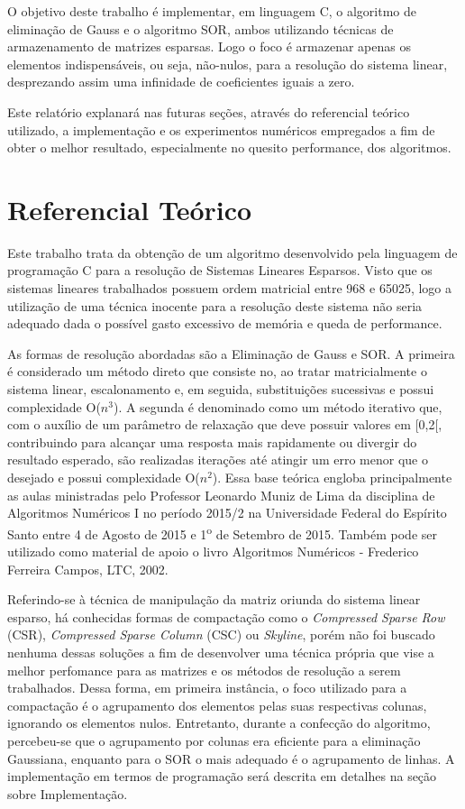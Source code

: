 \documentclass[
	article,			%
	11pt,				%
	oneside,			%
	a4paper,			%
	english,			%
	brazil,				%
	sumario=tradicional
	]{abntex2}
\begin{document}
O objetivo deste trabalho é implementar, em linguagem C, o algoritmo de eliminação de Gauss e o algoritmo SOR, ambos utilizando técnicas de armazenamento de matrizes esparsas. Logo o foco é armazenar apenas os elementos indispensáveis, ou seja, não-nulos, para a resolução do sistema linear, desprezando assim uma infinidade de coeficientes iguais a zero.

Este relatório explanará nas futuras seções, através do referencial teórico utilizado, a implementação e os experimentos numéricos empregados a fim de obter o melhor resultado, especialmente no quesito performance, dos algoritmos. 


\section{Referencial Teórico}

Este trabalho trata da obtenção de um algoritmo desenvolvido pela linguagem de programação C para a resolução de Sistemas Lineares Esparsos. Visto que os sistemas lineares trabalhados possuem ordem matricial entre 968 e 65025, logo a utilização de uma técnica inocente para a resolução deste sistema não seria adequado dada o possível gasto excessivo de memória e queda de performance. 

As formas de resolução abordadas são a Eliminação de Gauss e SOR. A primeira é considerado um método direto que consiste no, ao tratar matricialmente o sistema linear, escalonamento e, em seguida, substituições sucessivas e possui complexidade O($n^3$). A segunda é denominado como um método iterativo que, com o auxílio de um parâmetro de relaxação que deve possuir valores em [0,2[, contribuindo para alcançar uma resposta mais rapidamente ou divergir do resultado esperado, são realizadas iterações até atingir um erro menor que o desejado e possui complexidade O($n^2$). Essa base teórica engloba principalmente as aulas ministradas pelo Professor Leonardo Muniz de Lima da disciplina de Algoritmos Numéricos I no período 2015/2 na Universidade Federal do Espírito Santo entre 4 de Agosto de 2015 e 1\textsuperscript{o} de Setembro de 2015. Também pode ser utilizado como material de apoio o livro Algoritmos Numéricos - Frederico Ferreira Campos, LTC, 2002.

Referindo-se à técnica de manipulação da matriz oriunda do sistema linear esparso, há conhecidas formas de compactação como o \emph{Compressed Sparse Row} (CSR), \emph{Compressed Sparse Column} (CSC) ou \emph{Skyline}, porém não foi buscado nenhuma dessas soluções a fim de desenvolver uma técnica própria que vise a melhor perfomance para as matrizes e os métodos de resolução a serem trabalhados. Dessa forma, em primeira instância, o foco utilizado para a compactação é o agrupamento dos elementos pelas suas respectivas colunas, ignorando os elementos nulos. Entretanto, durante a confecção do algoritmo, percebeu-se que o agrupamento por colunas era eficiente para a eliminação Gaussiana, enquanto para o SOR o mais adequado é o agrupamento de linhas. A implementação em termos de programação será descrita em detalhes na seção sobre Implementação.
\end{document}
